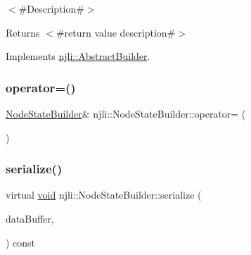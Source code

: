 $<$\#\+Description\#$>$

\begin{DoxyReturn}{Returns}
$<$\#return value description\#$>$ 
\end{DoxyReturn}


Implements \mbox{\hyperlink{classnjli_1_1_abstract_builder_a3e6e553e06d1ca30517ad5fb0bd4d000}{njli\+::\+Abstract\+Builder}}.

\mbox{\label{classnjli_1_1_node_state_builder_a2b7f47d5c47ffc145aa7cb924f322298}} 
\subsubsection{\texorpdfstring{operator=()}{operator=()}}
{\footnotesize\ttfamily \mbox{\hyperlink{classnjli_1_1_node_state_builder}{Node\+State\+Builder}}\& njli\+::\+Node\+State\+Builder\+::operator= (\begin{DoxyParamCaption}\item[{const \mbox{\hyperlink{classnjli_1_1_node_state_builder}{Node\+State\+Builder}} \&}]{ }\end{DoxyParamCaption})\hspace{0.3cm}{\ttfamily [protected]}}

\mbox{\label{classnjli_1_1_node_state_builder_a92d4e7b8cf9b1c6e7371879ed636d7ec}} 
\subsubsection{\texorpdfstring{serialize()}{serialize()}}
{\footnotesize\ttfamily virtual \mbox{\hyperlink{_thread_8h_af1e856da2e658414cb2456cb6f7ebc66}{void}} njli\+::\+Node\+State\+Builder\+::serialize (\begin{DoxyParamCaption}\item[{\mbox{\hyperlink{_thread_8h_af1e856da2e658414cb2456cb6f7ebc66}{void}} $\ast$}]{data\+Buffer,  }\item[{bt\+Serializer $\ast$}]{ }\end{DoxyParamCaption}) const\hspace{0.3cm}{\ttfamily [virtual]}}



